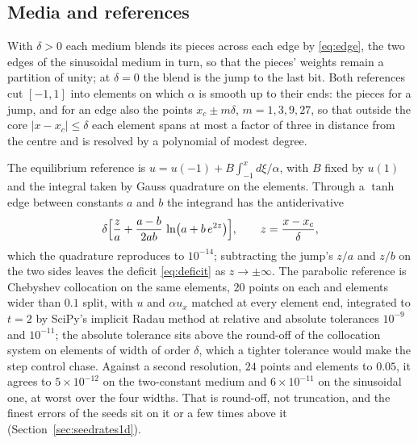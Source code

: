 \documentclass[11pt]{amsart}
\theoremstyle{definition}
\theoremstyle{remark}
\newcommand{\sci}[2]{#1 \times 10^{#2}}
\begin{document}
\subsection{Media and references}
\label{sec:media1d}
With $\delta > 0$ each medium blends its pieces across each edge by
\eqref{eq:edge}, the two edges of the sinusoidal medium in turn, so that the
pieces' weights remain a partition of unity; at $\delta = 0$ the blend is the
jump to the last bit. Both references cut $[-1, 1]$ into elements on which
$\alpha$ is smooth up to their ends: the pieces for a jump, and for an edge
also the points $x_c \pm m\delta$, $m = 1, 3, 9, 27$, so that outside the
core $|x - x_c| \le \delta$ each element spans at most a factor of three in
distance from the centre and is resolved by a polynomial of modest degree.

The equilibrium reference is $u = u(-1) + B \int_{-1}^{x} d\xi / \alpha$,
with $B$ fixed by $u(1)$ and the integral taken by Gauss quadrature on the
elements. Through a $\tanh$ edge between constants $a$ and $b$ the
integrand has the antiderivative
\begin{equation*}
  \delta \Bigl[ \frac{z}{a} + \frac{a - b}{2ab}\, \ln \bigl(a + b\, e^{2z}\bigr)
  \Bigr], \qquad z = \frac{x - x_c}{\delta},
\end{equation*}
which the quadrature reproduces to $10^{-14}$; subtracting the jump's
$z / a$ and $z / b$ on the two sides leaves the deficit \eqref{eq:deficit}
as $z \to \pm\infty$. The parabolic reference is Chebyshev collocation on
the same elements, $20$ points on each and elements wider than $0.1$ split,
with $u$ and $\alpha u_x$ matched at every element end, integrated to
$t = 2$ by SciPy's implicit Radau method at relative and absolute
tolerances $10^{-9}$ and $10^{-11}$; the absolute tolerance sits above the
round-off of the collocation system on elements of width of order $\delta$,
which a tighter tolerance would make the step control chase. Against a second
resolution, $24$ points and elements to $0.05$, it agrees to
$\sci{5}{-12}$ on the two-constant medium and $\sci{6}{-11}$ on the
sinusoidal one, at worst over the four widths. That is round-off, not
truncation, and the finest errors of the seeds sit on it or a few times
above it
(Section~\ref{sec:seedrates1d}).
\end{document}
